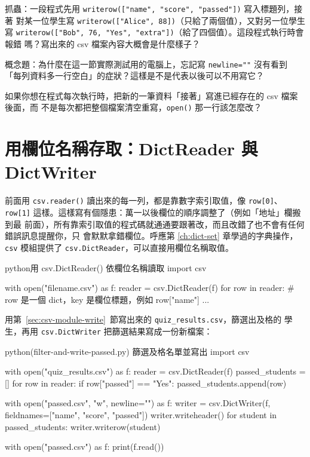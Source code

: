 \begin{drills}[label=drills:csv-writer-bugs]
\item 抓蟲：一段程式先用 \texttt{writerow(["name", "score", "passed"])} 寫入標題列，接著
對某一位學生寫 \texttt{writerow(["Alice", 88])}（只給了兩個值），又對另一位學生寫
\texttt{writerow(["Bob", 76, "Yes", "extra"])}（給了四個值）。這段程式執行時會報錯
嗎？寫出來的 csv 檔案內容大概會是什麼樣子？
\item 概念題：為什麼在這一節實際測試用的電腦上，忘記寫 \texttt{newline=""} 沒有看到
「每列資料多一行空白」的症狀？這樣是不是代表以後可以不用寫它？
\item 如果你想在程式每次執行時，把新的一筆資料「接著」寫進已經存在的 csv 檔案後面，而
不是每次都把整個檔案清空重寫，\texttt{open()} 那一行該怎麼改？
\end{drills}

\section{用欄位名稱存取：DictReader 與 DictWriter}
\label{sec:csv-dict}

前面用 \texttt{csv.reader()} 讀出來的每一列，都是靠數字索引取值，像 \texttt{row[0]}、
\texttt{row[1]} 這樣。這樣寫有個隱患：萬一以後欄位的順序調整了（例如「地址」欄搬到最
前面），所有靠索引取值的程式碼就通通要跟著改，而且改錯了也不會有任何錯誤訊息提醒你，只
會默默拿錯欄位。呼應第 \ref{ch:dict-set} 章學過的字典操作，\texttt{csv} 模組提供了
\texttt{csv.DictReader}，可以直接用欄位名稱取值。

\begin{code}{python}{用 csv.DictReader() 依欄位名稱讀取}
import csv

with open("filename.csv") as f:
    reader = csv.DictReader(f)
    for row in reader:
        # row 是一個 dict，key 是欄位標題，例如 row["name"]
        ...
\end{code}

用第~\ref{sec:csv-module-write}~節寫出來的 \texttt{quiz\_results.csv}，篩選出及格的
學生，再用 \texttt{csv.DictWriter} 把篩選結果寫成一份新檔案：

\begin{example}{python}{(filter-and-write-passed.py) 篩選及格名單並寫出}
import csv

with open("quiz_results.csv") as f:
    reader = csv.DictReader(f)
    passed_students = []
    for row in reader:
        if row["passed"] == "Yes":
            passed_students.append(row)

with open("passed.csv", "w", newline="") as f:
    writer = csv.DictWriter(f, fieldnames=["name", "score", "passed"])
    writer.writeheader()
    for student in passed_students:
        writer.writerow(student)

with open("passed.csv") as f:
    print(f.read())
\end{example}

